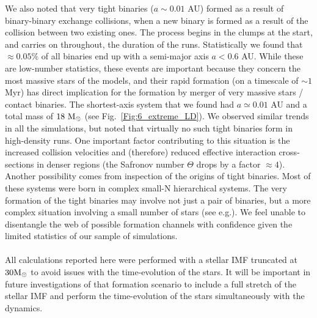 We also noted that very tight binaries ($a \sim 0.01 $ AU) formed as a result of binary-binary exchange collisions, when a new binary is formed as a result of the collision between two existing ones. The process begins in the clumps at the start, and carries on throughout, the duration of the runs. Statistically we found that $\approx 0.05\%$ of all binaries end up with  a semi-major axis $a < 0.6$ AU. While these are low-number statistics, these events are important because they concern the most massive stars of the models, and their rapid formation (on  a timescale of $\sim 1 $ Myr) has direct implication for the formation by merger of very massive stars / contact binaries. The shortest-axis system that we found had $a \simeq 0.01 $ AU and a total mass of $18~{\textrm{M}_\odot}$ (see Fig.~\ref{Fig:6_extreme_LD}).  We observed similar trends in all the simulations, but noted that  virtually no such tight binaries form in high-density runs.  One important factor contributing to this situation is  the increased collision velocities and (therefore) reduced effective interaction cross-sections in denser regions (the Safronov number $\Theta$ drops by a factor $\approx 4$). Another possibility comes from inspection of the origins of tight binaries. Most of these systems were born in complex small-N hierarchical systems. The very formation of the tight binaries may involve not just  a pair of binaries, but a more complex situation involving a small number of stars (see e.g.\citealt{Leigh2013,Geller2015}). We feel unable to disentangle the web of possible formation channels with confidence given the limited statistics of our sample of simulations. 

\paragraph*{}
All  calculations  reported here were performed with a stellar IMF truncated at $30 {\textrm{M}_\odot}$ to avoid issues with the time-evolution of the stars. It will be important in future investigations of that formation scenario to include a full stretch of the stellar IMF and perform the time-evolution of the 
stars simultaneously with the dynamics. 

